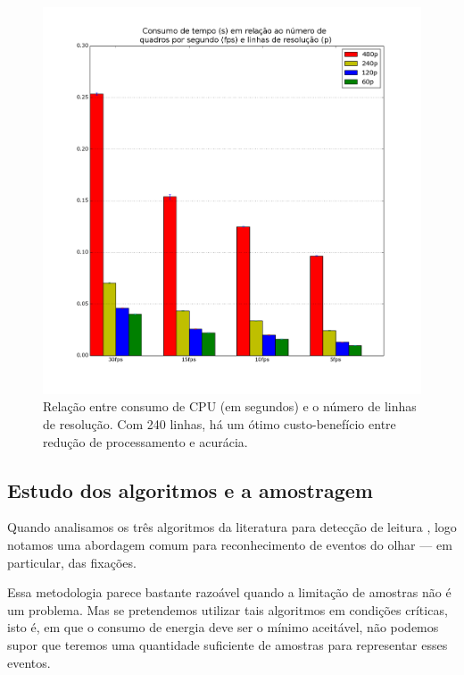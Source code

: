 \documentclass[12pt]{article}
\begin{document}
		\begin{figure}[!ht]
			\centering
			\includegraphics[width=13cm]{imgs/lowpower.png}
			\caption{\footnotesize {Relação entre consumo de CPU (em segundos) e o número de linhas de resolução. Com 240 linhas, há um ótimo custo-benefício entre redução de processamento e acurácia.}}
			\label{fig:lowpower}
			\vspace{5mm}
		\end{figure}  
		
		\subsection{Estudo dos algoritmos e a amostragem}
		Quando analisamos os três algoritmos da literatura para detecção de leitura \cite{Campbell-2001, Buscher-2008, Kollmorgen-2007}, logo notamos uma abordagem comum para reconhecimento de eventos do olhar --- em particular, das fixações.
		
		Essa metodologia parece bastante razoável quando a limitação de amostras não é um problema. Mas se pretendemos utilizar tais algoritmos em condições críticas, isto é, em que o consumo de energia deve ser o mínimo aceitável, não podemos supor que teremos uma quantidade suficiente de amostras para representar esses eventos.
		
\end{document}
